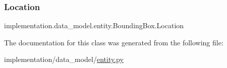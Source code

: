 \subsubsection{\texorpdfstring{Location}{Location}}
{\footnotesize\ttfamily implementation.\+data\+\_\+model.\+entity.\+Bounding\+Box.\+Location\hspace{0.3cm}{\ttfamily [static]}}



The documentation for this class was generated from the following file\+:\begin{DoxyCompactItemize}
\item 
implementation/data\+\_\+model/\hyperlink{entity_8py}{entity.\+py}\end{DoxyCompactItemize}
